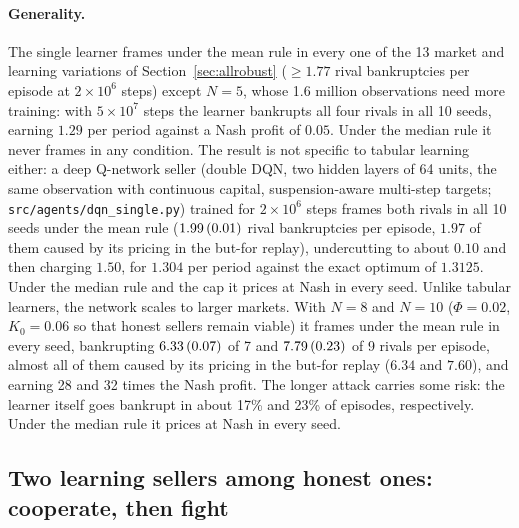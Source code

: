 \documentclass{article}
\newcommand{\se}[1]{\,{\scriptsize(#1)}}
\begin{document}
\paragraph{Generality.} The single learner frames under the mean rule in every one of the 13 market and learning variations of Section~\ref{sec:allrobust} ($\ge1.77$ rival bankruptcies per episode at $2\times10^6$ steps) except $N=5$, whose 1.6 million observations need more training: with $5\times10^7$ steps the learner bankrupts all four rivals in all 10 seeds, earning $1.29$ per period against a Nash profit of $0.05$. Under the median rule it never frames in any condition. The result is not specific to tabular learning either: a deep Q-network seller (double DQN, two hidden layers of 64 units, the same observation with continuous capital, suspension-aware multi-step targets; \texttt{src/agents/dqn\_single.py}) trained for $2\times10^6$ steps frames both rivals in all 10 seeds under the mean rule ($1.99\se{0.01}$ rival bankruptcies per episode, $1.97$ of them caused by its pricing in the but-for replay), undercutting to about $0.10$ and then charging $1.50$, for $1.304$ per period against the exact optimum of $1.3125$. Under the median rule and the cap it prices at Nash in every seed. Unlike tabular learners, the network scales to larger markets. With $N=8$ and $N=10$ ($\Phi=0.02$, $K_0=0.06$ so that honest sellers remain viable) it frames under the mean rule in every seed, bankrupting $6.33\se{0.07}$ of 7 and $7.79\se{0.23}$ of 9 rivals per episode, almost all of them caused by its pricing in the but-for replay ($6.34$ and $7.60$), and earning 28 and 32 times the Nash profit. The longer attack carries some risk: the learner itself goes bankrupt in about 17\% and 23\% of episodes, respectively. Under the median rule it prices at Nash in every seed.

\subsection{Two learning sellers among honest ones: cooperate, then fight}
\label{sec:twolearners}
\end{document}
